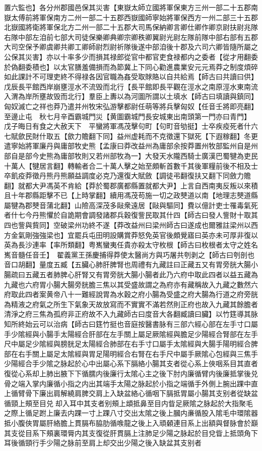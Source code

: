 置六監也】各分州郡國邑保其災害【東嶽太師立國將軍保東方三州一部二十五郡南嶽太傅前將軍保南方二州一部二十五郡西嶽國師寧始將軍保西方一州二部三十五郡北嶽國將衛將軍保北方二州一部二十五郡大司馬保納卿言卿仕卿作卿京尉扶尉兆隊右隊中部左洎前七部大司徒保樂卿典卿宗卿秩卿翼尉光尉左隊前隊中部右部有五郡大司空保予卿虞卿共卿工卿師尉烈尉祈隊後遂中部洎後十郡及六司六卿皆隨所屬之公保其災害】亦以十率多少而損其禄郎從官中都官吏食禄都内之委者【從才用翻委於偽翻委積也】以太官膳羞備損而為節冀上下同心勸進農業安元元焉莽之制度煩碎如此課計不可理吏終不得禄各因官職為姦受取賕賂以自共給焉【師古曰共讀曰供】　戊辰長平館西岸崩壅涇水不流毁而北行【長平館即長平觀在涇水之南原涇水東南流入渭為岸所壅故毁而北行】羣臣上夀以為河圖所謂以土填水【師古曰填讀與鎮同】匈奴滅亡之祥也莽乃遣并州牧宋弘游擊都尉任萌等將兵擊匈奴【任音壬將即亮翻】至邊止屯　秋七月辛酉霸城門災【黄圖霸城門長安城東出南頭第一門亦曰青門】　戊子晦日有食之大赦天下　平蠻將軍馮茂擊句町【句町音劬挺】士卒疾疫死者什六七賦歛民財什取五【歛力贍翻下同】益州虚耗而不克徵還下獄死【下遐稼翻】冬更遣寧始將軍廉丹與庸部牧史熊【孟康曰莽改益州為庸部余按莽置州牧部監州自是州部自是部今史熊為庸部牧則又若州部牧為一】大發天水隴西騎士廣漢巴蜀犍為吏民十萬人【犍居言翻】轉輸者合二十萬人擊之始至頗斬首數千其後軍糧前後不相及士卒飢疫莽徵丹熊丹熊願益調度必克乃還復大賦斂【調徒弔翻復扶又翻下同斂力贍翻】就都大尹馮英不肯給【莽於蜀郡廣都縣置就都大尹】上言自西南夷反叛以來積且十年郡縣距擊不已【上時掌翻】續用馮茂苟施一切之政僰道以南【地理志僰道縣屬犍為郡僰音蒲北翻】山險高深茂多敺衆遠居【敺與驅同】費以億計吏士罹毒氣死者什七今丹熊懼於自詭期會調發諸郡兵穀復訾民取其什四【師古曰發人訾財十取其四也訾與貲同】空破梁州功終不遂【莽改益州曰梁州師古曰遂成也爾雅註梁州以西方金氣剛強強梁也】宜罷兵屯田明設購賞莽怒免英官後頗覺寤曰英亦未可厚非復以英為長沙連率【率所類翻】粤嶲蠻夷任貴亦殺太守枚根【師古曰枚根者太守之姓名嶲音髓任音壬】　翟義黨王孫慶捕得莽使太醫尚方與巧屠共刳剥之【師古曰刳剖也音口胡翻】量度五臧【五臟心肺肝脾腎也周禮有九藏註曰正藏五又有胃旁胱大腸小腸疏曰五藏五者肺脾心肝腎又有胃旁胱大腸小腸者此乃六府中取此四者以益五藏為九藏也六府胃小腸大腸旁胱膽三焦以其受盛故謂之為府亦有藏稱故入九藏之數然六府取此四者案黄帝八十一難經說胃為水穀之府小腸為受盛之府大腸為行道之府旁胱為精液之府氣之所生下氣象天故放寫而不實實不滿若然則正府也故入九藏其餘膽者清淨之府三焦為孤府非正府故不入九藏師古曰度音大各翻臧讀曰臟】以竹筳導其脉知所終始云可以治病【師古曰筳竹挺也音庭按醫書脉有三部六經心部在左手寸口屬手少隂經與小腸手太陽經合肝部在左手關上屬足厥隂經與膽足少陽經合腎部在左手尺中屬足少隂經與膀胱足太陽經合肺部在右手寸口屬手太隂經與大腸手陽明經合脾部在右手關上屬足太隂經與胃足陽明經合右腎在右手尺中屬手厥隂心包經與三焦手少陽經合手少隂之脉起於心中出屬心系下膈絡小腸其支者從心系上俠咽系目其直者復從心系却上肺出腋下下循臑内後廉行太隂心主之後下肘内廉循臂内後廉抵掌後兑骨之端入掌内廉循小指之内出其端手太陽之脉起於小指之端循手外側上腕出踝中直上循臂骨下廉出肩解繞肩脾交肩上入缺盆絡心循咽下膈抵胃屬小腸其支别者從缺盆循頸上頰至目兑却入耳中其支者别頰上䪼抵鼻至目内眥足厥隂之脉起於大指聚毛之際上循足跗上廉去内踝一寸上踝八寸交出太隂之後上膕内亷循股入隂毛中環隂器抵小腹俠胃屬肝絡膽上貫膈布脇肋循㗋龍之後上入頑顙連目系上出額與督脉會於巔其支從目系下頰裏環脣内其支復從肝貫膈上注肺足少陽之脉起於目兌眥上抵頭角下耳後循頸行手少陽之脉前至肩上却交出少陽之後入缺盆其支别者